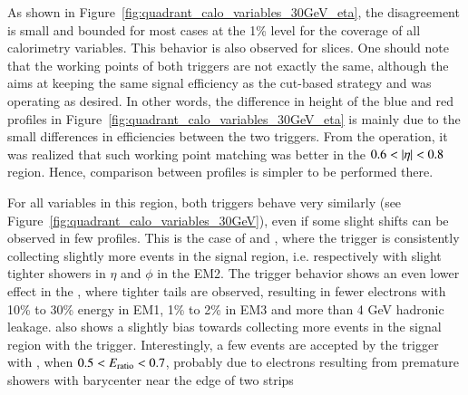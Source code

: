 As shown in Figure~\ref{fig:quadrant_calo_variables_30GeV_eta}, the disagreement is small and bounded for most cases at the 1\% level for the coverage of all calorimetry variables. 
This behavior is also observed for \et{} slices. 
One should note that the working points of both triggers are not exactly the same, although the \rnn{} aims at keeping the same signal efficiency as the cut-based strategy and was operating as desired.  
In other words, 
the difference in height of the blue and red profiles in Figure~\ref{fig:quadrant_calo_variables_30GeV_eta} is mainly due to the small differences in efficiencies between the two triggers.
From the operation, it was realized that such working point matching was better in the $0.6<\abseta{}<0.8$ region. Hence, comparison between profiles is simpler to be performed there.

For all variables in this region, both triggers behave very similarly (see Figure~\ref{fig:quadrant_calo_variables_30GeV}), even if some slight shifts can be observed in few profiles. This is the case of \reta{} and \rphi{}, where the \rnn{} trigger is consistently collecting slightly more events in the signal region, i.e. respectively with slight tighter showers in $\eta{}$ and $\phi{}$ in the EM2. The \rnn{} trigger behavior shows an even lower effect in the \rhad{}, where tighter tails are observed, resulting in fewer electrons with 10\% to 30\% energy in EM1, 1\% to 2\% in EM3 and more than 4 GeV hadronic leakage. \eratio{} also shows a slightly bias towards collecting more events in the signal region with the \rnn{} trigger. Interestingly, a few events are accepted by the trigger with \rnn{}, when $0.5<E_\text{ratio}{}<0.7$, probably due to electrons resulting from premature showers with barycenter near the edge of two strips

